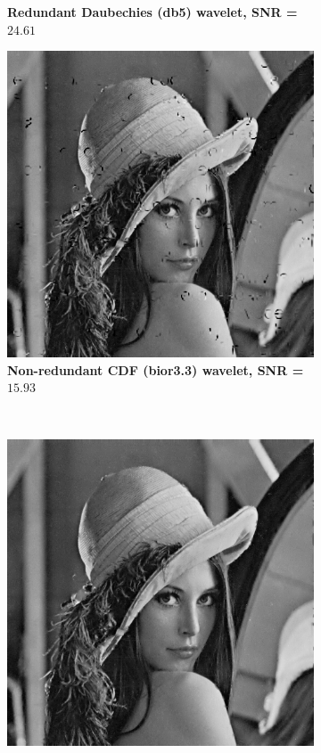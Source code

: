 \begin{figure}
\begin{subfigure}[b]{0.4\textwidth}
        \caption{\textbf{ Redundant Daubechies (db5) wavelet, SNR = $\mathbf{24.61}$} }
        \label{fig:matti_fig_rwt_db5}
    \end{subfigure}
        \begin{subfigure}[b]{0.4\textwidth}
        \includegraphics[width=\textwidth]{../src/inpainting/vraag_2_3_wt_bior33}
        \caption{\textbf{ Non-redundant CDF (bior3.3) wavelet, SNR = $\mathbf{15.93}$} }
        \label{fig:matti_fig_wt_bior33}
    \end{subfigure}
    ~ %
    \begin{subfigure}[b]{0.4\textwidth}
        \includegraphics[width=\textwidth]{../src/inpainting/vraag_2_3_rwt_bior33}

\end{subfigure}
\end{figure}
